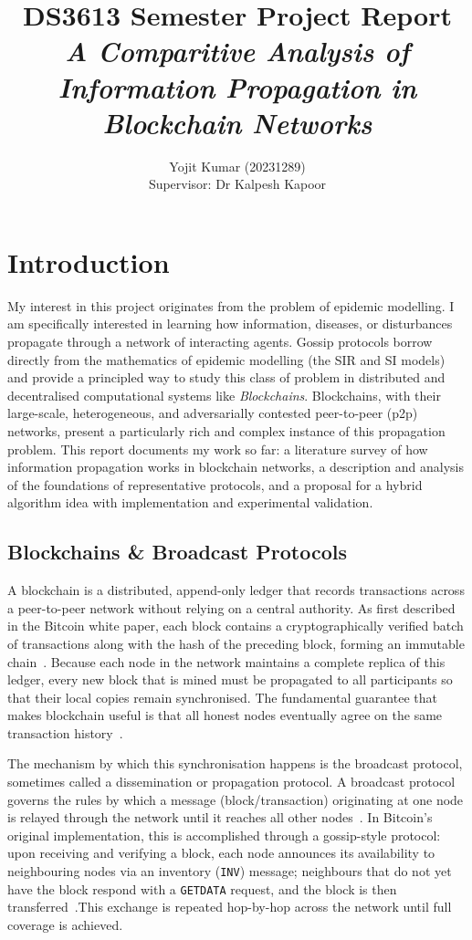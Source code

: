 \documentclass{article}
\title{DS3613 Semester Project Report\\
	\em{A Comparitive Analysis of Information Propagation in Blockchain Networks}
}
\author{Yojit Kumar (20231289)\\
  Supervisor: Dr Kalpesh Kapoor}
\date{}
\begin{document}
\maketitle



\section{Introduction}
My interest in this project originates from the problem of epidemic modelling. I am specifically interested in learning how information, diseases, or disturbances propagate through a network of interacting agents. Gossip protocols borrow directly from the mathematics of epidemic modelling (the SIR and SI models) and provide a principled way to study this class of problem in distributed and decentralised computational systems like \textit{Blockchains}. Blockchains, with their large-scale, heterogeneous, and adversarially contested peer-to-peer (p2p) networks, present a particularly rich and complex instance of this propagation problem. This report documents my work so far: a literature survey of how information propagation works in blockchain networks, a description and analysis of the foundations of representative protocols, and a proposal for a hybrid algorithm idea with implementation and experimental validation.


\subsection{Blockchains \& Broadcast Protocols}
A blockchain is a distributed, append-only ledger that records transactions across a peer-to-peer network without relying on a central authority. As first described in the Bitcoin white paper, each block contains a cryptographically verified batch of transactions along with the hash of the preceding block, forming an immutable chain~\cite{nakamotoBitcoinPeertoPeerElectronic2008}. Because each node in the network maintains a complete replica of this ledger, every new block that is mined must be propagated to all participants so that their local copies remain synchronised. The fundamental guarantee that makes blockchain useful is that all honest nodes eventually agree on the same transaction history~\cite{deckerInformationPropagationBitcoin2013}.

The mechanism by which this synchronisation happens is the broadcast protocol, sometimes called a dissemination or propagation protocol. A broadcast protocol governs the rules by which a message (block/transaction) originating at one node is relayed through the network until it reaches all other nodes~\cite{deckerInformationPropagationBitcoin2013}. In Bitcoin's original implementation, this is accomplished through a gossip-style protocol: upon receiving and verifying a block, each node announces its availability to neighbouring nodes via an inventory (\texttt{INV}) message; neighbours that do not yet have the block respond with a \texttt{GETDATA} request, and the block is then transferred~\cite{deckerInformationPropagationBitcoin2013}.This exchange is repeated hop-by-hop across the network until full coverage is achieved.
\end{document}
